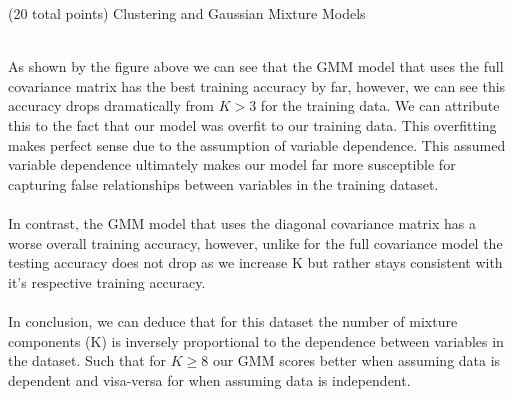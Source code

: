 \documentclass[12pt]{article}
\begin{document}
\begin{question}{(20 total points) Clustering and Gaussian Mixture Models}
\begin{subquestion}
\begin{answerbox}{30em}
{\\ 
        As shown by the figure above we can see that the GMM model that uses the full covariance matrix has the best training accuracy by far, however, we can see this accuracy drops dramatically from $K > 3$ for the training data. We can attribute this to the fact that our model was overfit to our training data. This overfitting makes perfect sense due to the assumption of variable dependence. This assumed variable dependence ultimately makes our model far more susceptible for capturing false relationships between variables in the training dataset.\\
\\
        In contrast, the GMM model that uses the diagonal covariance matrix has a worse overall training accuracy, however, unlike for the full covariance model the testing accuracy does not drop as we increase K but rather stays consistent with it's respective training accuracy.
\\
\\
        In conclusion, we can deduce that for this dataset the number of mixture components (K) is inversely proportional to the dependence between variables in the dataset. Such that for $K \geq 8$ our GMM scores better when assuming data is dependent and visa-versa for when assuming data is independent.
        }
      \end{answerbox}
  


   \end{subquestion}

   
\end{question}
\end{document}
